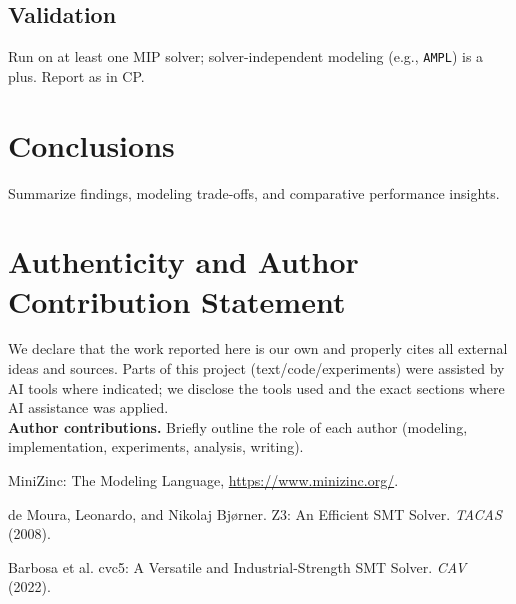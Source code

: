 \documentclass{article}
\begin{document}
\subsection{Validation}
Run on at least one MIP solver; solver-independent modeling (e.g., \texttt{AMPL}) is a plus.
Report as in CP.

\section{Conclusions}
Summarize findings, modeling trade-offs, and comparative performance insights.

\section*{Authenticity and Author Contribution Statement}
We declare that the work reported here is our own and properly cites all external ideas and sources.
Parts of this project (text/code/experiments) were assisted by AI tools where indicated; we disclose the tools used and the exact sections where AI assistance was applied.
\\[0.5em]
\textbf{Author contributions.} Briefly outline the role of each author (modeling, implementation, experiments, analysis, writing).

\begin{thebibliography}{9}

MiniZinc: The Modeling Language,
\url{https://www.minizinc.org/}.

de Moura, Leonardo, and Nikolaj Bj{\o}rner.
Z3: An Efficient SMT Solver.
\emph{TACAS} (2008).

Barbosa et al.
cvc5: A Versatile and Industrial-Strength SMT Solver.
\emph{CAV} (2022).

\end{thebibliography}
\end{document}
